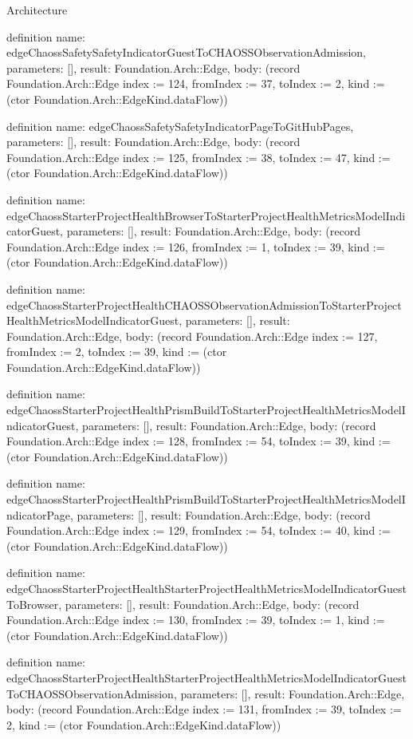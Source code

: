 \begin{lexlean}{Architecture}
\begin{semanticmodule}
definition{
  name: edgeChaossSafetySafetyIndicatorGuestToCHAOSSObservationAdmission,
  parameters: [],
  result: Foundation.Arch::Edge,
  body: (record Foundation.Arch::Edge {index := 124, fromIndex := 37, toIndex := 2, kind := (ctor Foundation.Arch::EdgeKind.dataFlow)})
}

definition{
  name: edgeChaossSafetySafetyIndicatorPageToGitHubPages,
  parameters: [],
  result: Foundation.Arch::Edge,
  body: (record Foundation.Arch::Edge {index := 125, fromIndex := 38, toIndex := 47, kind := (ctor Foundation.Arch::EdgeKind.dataFlow)})
}

definition{
  name: edgeChaossStarterProjectHealthBrowserToStarterProjectHealthMetricsModelIndicatorGuest,
  parameters: [],
  result: Foundation.Arch::Edge,
  body: (record Foundation.Arch::Edge {index := 126, fromIndex := 1, toIndex := 39, kind := (ctor Foundation.Arch::EdgeKind.dataFlow)})
}

definition{
  name: edgeChaossStarterProjectHealthCHAOSSObservationAdmissionToStarterProjectHealthMetricsModelIndicatorGuest,
  parameters: [],
  result: Foundation.Arch::Edge,
  body: (record Foundation.Arch::Edge {index := 127, fromIndex := 2, toIndex := 39, kind := (ctor Foundation.Arch::EdgeKind.dataFlow)})
}

definition{
  name: edgeChaossStarterProjectHealthPrismBuildToStarterProjectHealthMetricsModelIndicatorGuest,
  parameters: [],
  result: Foundation.Arch::Edge,
  body: (record Foundation.Arch::Edge {index := 128, fromIndex := 54, toIndex := 39, kind := (ctor Foundation.Arch::EdgeKind.dataFlow)})
}

definition{
  name: edgeChaossStarterProjectHealthPrismBuildToStarterProjectHealthMetricsModelIndicatorPage,
  parameters: [],
  result: Foundation.Arch::Edge,
  body: (record Foundation.Arch::Edge {index := 129, fromIndex := 54, toIndex := 40, kind := (ctor Foundation.Arch::EdgeKind.dataFlow)})
}

definition{
  name: edgeChaossStarterProjectHealthStarterProjectHealthMetricsModelIndicatorGuestToBrowser,
  parameters: [],
  result: Foundation.Arch::Edge,
  body: (record Foundation.Arch::Edge {index := 130, fromIndex := 39, toIndex := 1, kind := (ctor Foundation.Arch::EdgeKind.dataFlow)})
}

definition{
  name: edgeChaossStarterProjectHealthStarterProjectHealthMetricsModelIndicatorGuestToCHAOSSObservationAdmission,
  parameters: [],
  result: Foundation.Arch::Edge,
  body: (record Foundation.Arch::Edge {index := 131, fromIndex := 39, toIndex := 2, kind := (ctor Foundation.Arch::EdgeKind.dataFlow)})
}


\end{semanticmodule}
\end{lexlean}
